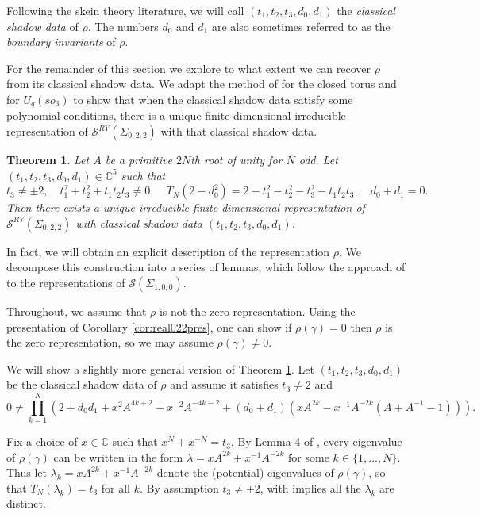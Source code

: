\documentclass{article}
\newcommand{\C}{\mathbb{C}}
\renewcommand{\S}{\mathcal{S}}
\newcommand{\SRY}{\mathcal{S}^{RY}}
\newcommand{\san}{\Sigma_{0,2,2}}
\newcommand{\sto}{\Sigma_{1,0,0}}
\newtheorem{theorem}{Theorem}[section]
\theoremstyle{definition}
\renewcommand{\san}{\Sigma_{0, 2, 2}}
\renewcommand{\SRY}{\ensuremath{ \mathcal S^{RY}}}
\begin{document}
Following the skein theory literature, we will call $(t_1, t_2, t_3, d_0, d_1)$ the \emph{classical shadow data} of $\rho$.  The numbers $d_0$ and $d_1$ are also sometimes referred to as the \emph{boundary invariants} of $\rho$.  



For the remainder of this section we explore to what extent we can recover $\rho$ from its classical shadow data.    We adapt the method of \cite{TakenovReps} for the closed torus and \cite{HavlicekPosta} for $U_q(so_3)$  to show that when the classical shadow data satisfy some polynomial conditions,  there is a unique finite-dimensional irreducible representation of $\SRY(\san)$ with that classical shadow data.  


 \begin{theorem}\label{thm:reps-simple}
 Let $A$ be a primitive $2N$th root of unity for $N$ odd. Let $(t_1,t_2,t_3,d_0, d_1) \in \C^5$ such that  
 \[ t_3 \neq \pm 2, \quad 
t_1^2+t_2^2+t_1t_2t_3\neq 0, \quad 
  T_N(2-d_0^2)= 2 -t_1^2-t_2^2-t_3^2-t_1t_2t_3, \quad 
 d_0 + d_1 = 0.   \] 
 Then there exists a unique irreducible finite-dimensional representation of $\SRY(\san)$ with classical shadow data $(t_1,t_2,t_3, d_0, d_1)$. 
 \end{theorem}


In fact, we will obtain an explicit description of the representation $\rho$. We decompose this construction into a series of lemmas, which follow the approach of \cite{TakenovReps} to the representations of $\S(\sto)$. 

Throughout, we assume that $\rho$ is not the zero representation. Using the presentation of Corollary \ref{cor:real022pres}, one can show if $\rho(\gamma)= 0$ then $\rho$ is the zero representation, so we may assume $\rho(\gamma)\neq 0$.

We will show a slightly more general version of Theorem \ref{thm:reps-simple}. Let $(t_1, t_2, t_3, d_0, d_1)$ be the classical shadow data of $\rho$ and assume it satisfies $t_3\neq 2$ and 
\begin{equation}\label{eqn:ugly-assumption}
0\neq \prod_{k=1}^N (2+d_0d_1+x^2A^{4k+2}+x^{-2}A^{-4k-2}+(d_0+d_1)(xA^{2k}-x^{-1}A^{-2k}(A+A^{-1}-1))).
\end{equation}

Fix a choice of $x\in \C$ such that $x^N+x^{-N}=t_3.$ By Lemma 4 of \cite{TakenovReps}, every eigenvalue of $\rho(\gamma)$ can be written in the form  $\lambda=xA^{2k}+x^{-1}A^{-2k}$ for some $k\in \{1,\ldots,N\}$. Thus let $\lambda_k=xA^{2k}+x^{-1}A^{-2k}$ denote the (potential) eigenvalues of $\rho(\gamma)$, so that  $T_N(\lambda_k)=t_3$ for all $k$. By assumption $t_3\neq \pm 2$, with implies all the $\lambda_k$ are distinct.
\end{document}
